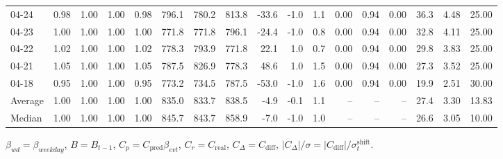 \begin{threeparttable}
{\begin{tabular}{lrrrrrrrrrrrrrrrr}
  04-24 &         0.98 &           1.00 &          1.00 &          0.98 & 796.1 & 780.2 & 813.8 &      -33.6 &                     -1.0 &                 1.1 &       0.00 &      0.94 &           0.00 &             36.3 &            4.48 &                  25.00 \\
  04-23 &         1.00 &           1.00 &          1.00 &          1.00 & 771.8 & 771.8 & 796.1 &      -24.4 &                     -1.0 &                 0.8 &       0.00 &      0.94 &           0.00 &             32.8 &            4.11 &                  25.00 \\
  04-22 &         1.02 &           1.00 &          1.00 &          1.02 & 778.3 & 793.9 & 771.8 &       22.1 &                      1.0 &                 0.7 &       0.00 &      0.94 &           0.00 &             29.8 &            3.83 &                  25.00 \\
  04-21 &         1.05 &           1.00 &          1.00 &          1.05 & 787.5 & 826.9 & 778.3 &       48.6 &                      1.0 &                 1.5 &       0.00 &      0.94 &           0.00 &             27.3 &            3.52 &                  25.00 \\
  04-18 &         0.95 &           1.00 &          1.00 &          0.95 & 773.2 & 734.5 & 787.5 &      -53.0 &                     -1.0 &                 1.6 &       0.00 &      0.94 &           0.00 &             19.9 &            2.51 &                  30.00 \\
Average &         1.00 &           1.00 &          1.00 &          1.00 & 835.0 & 833.7 & 838.5 &       -4.9 &                     -0.1 &                 1.1 &         -- &        -- &             -- &             27.4 &            3.30 &                  13.83 \\
 Median &         1.00 &           1.00 &          1.00 &          1.00 & 845.7 & 843.7 & 858.9 &       -7.0 &                     -1.0 &                 1.0 &         -- &        -- &             -- &             26.6 &            3.05 &                  10.00 \\
\bottomrule
\end{tabular}
}
\begin{tablenotes}\footnotesize
\item $\beta_{wd}=\beta_{weekday}$, $B=B_{t-1}$,
$C_p=C_{\text{pred}}\beta_{evt}$, $C_r=C_{\text{real}}$,
$C_\Delta=C_{\text{diff}}$, $|C_\Delta|/\sigma=|C_{\text{diff}}|/\sigma_t^{\text{shift}}$.
\end{tablenotes}
\end{threeparttable}
\endgroup
